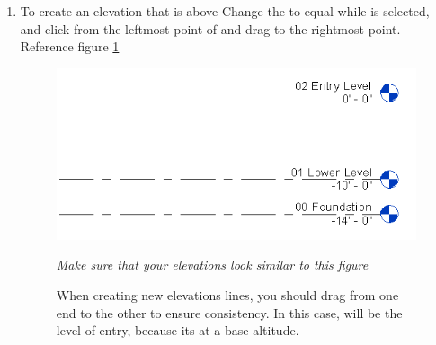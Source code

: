 \documentclass{tufte-book} %
\begin{document}
\begin{enumerate}
\begin{marginfigure}
	\end{marginfigure}
	
	\item To create an elevation that is  above  Change the  to equal  while  is selected, and click from the leftmost point of  and drag to the rightmost point. Reference figure \ref{fig:revelevlinethree}
	
	\begin{figure}
		\includegraphics[width=\linewidth]{revitelevationlinethree.png}
		\caption{When creating new elevations lines, you should drag from one end to the other to ensure consistency. In this case,  will be the level of entry, because its at a base altitude.}
		\emph{Make sure that your elevations look similar to this figure}
		\label{fig:revelevlinethree}
	\end{figure}
	

\end{enumerate}
\end{document}

